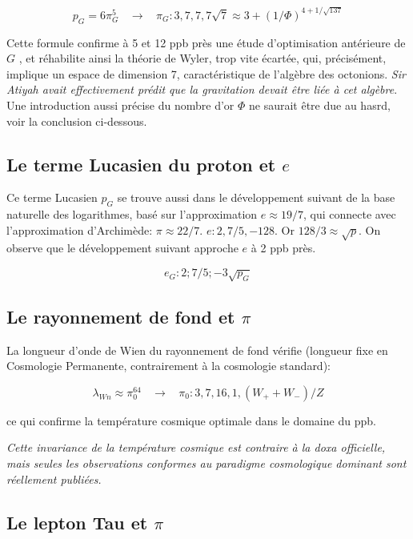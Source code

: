 \documentclass[a4paper,9pt]{article}
\newcounter{row}
\begin{document}
\begin{equation}
p_G = 6\pi_G^5~~~~ \rightarrow  ~~~~ \pi_G : 3, 7, 7, 7\sqrt 7 \approx 3 + (1/\Phi)^{4+1/\sqrt{137}} 
\end{equation}

Cette formule confirme à 5 et 12 ppb près une étude d'optimisation antérieure de $G$ \cite{Sanchez2}, et réhabilite ainsi la théorie de Wyler, trop vite écartée, qui, précisément, implique un espace de dimension 7, caractéristique de l'algèbre des octonions. \textit{Sir Atiyah avait effectivement prédit que la gravitation devait être liée à cet algèbre}\cite {Atiyah}. Une introduction aussi précise du nombre d'or $\Phi$ ne saurait être due au hasrd, voir la conclusion ci-dessous. 


\subsection{Le terme Lucasien du proton et $e$}
Ce terme Lucasien $p_G$ se trouve aussi dans le développement suivant de la base naturelle des logarithmes, basé sur l'approximation $e \approx 19/7$, qui connecte avec l'approximation d'Archimède: $\pi \approx 22/7$. $e : 2, 7/5, -128$. Or $128/3 \approx \sqrt p$. On observe que le développement suivant approche $e$ à 2 ppb près.

\begin{equation}
e_G : 2; 7/5;  -3\sqrt{p_G} 
\end{equation}


\subsection{Le rayonnement de fond et $\pi$}
La longueur d'onde de Wien du rayonnement de fond vérifie (longueur fixe en Cosmologie Permanente, contrairement à la cosmologie standard):

\begin{equation}
\lambda_{Wn} \approx \pi_0^{64}~~~~ \rightarrow  ~~~~ \pi_0 : 3, 7, 16, 1, (W_+ + W_-)/Z
\end{equation}

ce qui confirme la température cosmique optimale \cite{Sanchez2} dans le domaine du ppb. 

\textit{ Cette invariance de la température cosmique est contraire à la doxa officielle, mais seules les observations conformes au paradigme cosmologique dominant sont réellement publiées.}


\subsection{Le lepton Tau et $\pi$}
\end{document}
